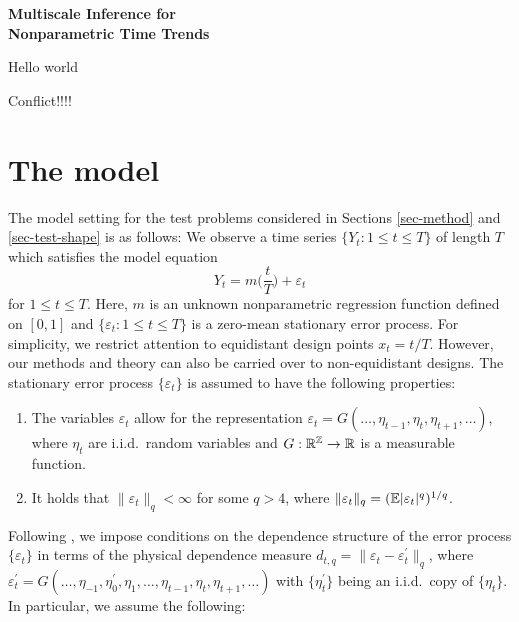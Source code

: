 \documentclass[a4paper,12pt]{article}
\numberwithin{equation}{section}
\begin{document}
\begin{center}
{\LARGE \textbf{Multiscale Inference for}} \\[0.35cm]
{\LARGE \textbf{Nonparametric Time Trends}}
\end{center}

Hello world

Conflict!!!!



\section{The model}\label{sec-model}


The model setting for the test problems considered in Sections \ref{sec-method} and \ref{sec-test-shape} is as follows: We observe a time series $\{Y_t: 1 \le t \le T \}$ of length $T$ which satisfies the model equation 
\begin{equation}\label{model1}
Y_t = m \Big( \frac{t}{T} \Big) + \varepsilon_t 
\end{equation}
for $1 \le t \le T$. Here, $m$ is an unknown nonparametric regression function defined on $[0,1]$ and $\{ \varepsilon_t: 1 \le t \le T \}$ is a zero-mean stationary error process. For simplicity, we restrict attention to equidistant design points $x_t = t/T$. However, our methods and theory can also be carried over to non-equidistant designs. The stationary error process $\{\varepsilon_t\}$ is assumed to have the following properties: 
\begin{enumerate}[label=(C\arabic*),leftmargin=1.05cm]

\item \label{C-err1} The variables $\varepsilon_t$ allow for the representation $\varepsilon_t = G(\ldots,\eta_{t-1},\eta_t,\eta_{t+1},\ldots)$, where $\eta_t$ are i.i.d.\ random variables and $G: \mathbb{R}^{\mathbb{Z}} \rightarrow \mathbb{R}$ is a measurable function. 

\item \label{C-err2} It holds that $\| \varepsilon_t \|_q < \infty$ for some $q > 4$, where $\| \varepsilon_t \|_q = (\mathbb{E}|\varepsilon_t|^q)^{1/q}$. 

\end{enumerate}
Following \cite{Wu2005}, we impose conditions on the dependence structure of the error process $\{\varepsilon_t\}$ in terms of the physical dependence measure $d_{t,q} = \| \varepsilon_t - \varepsilon_t^\prime \|_q$, where $\varepsilon_t^\prime = G(\ldots,\eta_{-1},\eta_0^\prime,\eta_1,\ldots,\eta_{t-1},\eta_t,\eta_{t+1},\ldots)$ with $\{\eta_t^\prime\}$ being an i.i.d.\ copy of $\{\eta_t\}$. In particular, we assume the following: 
\end{document}
